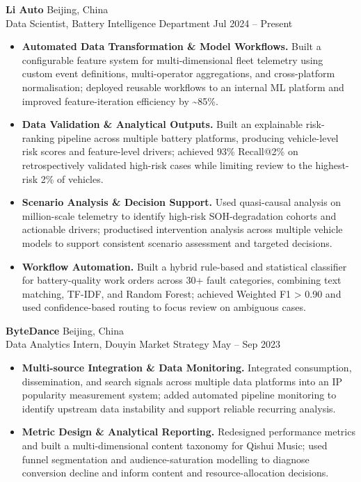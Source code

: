 \documentclass[a4paper,10pt]{article}
\begin{document}
\noindent\textbf{Li Auto} \hfill Beijing, China\\
Data Scientist, Battery Intelligence Department \hfill Jul 2024 -- Present
\begin{itemize}
    \item \textbf{Automated Data Transformation \& Model Workflows.} Built a configurable feature system for multi-dimensional fleet telemetry using custom event definitions, multi-operator aggregations, and cross-platform normalisation; deployed reusable workflows to an internal ML platform and improved feature-iteration efficiency by \textasciitilde85\%.

    \item \textbf{Data Validation \& Analytical Outputs.} Built an explainable risk-ranking pipeline across multiple battery platforms, producing vehicle-level risk scores and feature-level drivers; achieved 93\% Recall@2\% on retrospectively validated high-risk cases while limiting review to the highest-risk 2\% of vehicles.

    \item \textbf{Scenario Analysis \& Decision Support.} Used quasi-causal analysis on million-scale telemetry to identify high-risk SOH-degradation cohorts and actionable drivers; productised intervention analysis across multiple vehicle models to support consistent scenario assessment and targeted decisions.

    \item \textbf{Workflow Automation.} Built a hybrid rule-based and statistical classifier for battery-quality work orders across 30+ fault categories, combining text matching, TF-IDF, and Random Forest; achieved Weighted F1 > 0.90 and used confidence-based routing to focus review on ambiguous cases.
\end{itemize}

\vspace{2pt}
\noindent\textbf{ByteDance} \hfill Beijing, China\\
Data Analytics Intern, Douyin Market Strategy \hfill May -- Sep 2023
\begin{itemize}
    \item \textbf{Multi-source Integration \& Data Monitoring.} Integrated consumption, dissemination, and search signals across multiple data platforms into an IP popularity measurement system; added automated pipeline monitoring to identify upstream data instability and support reliable recurring analysis.

    \item \textbf{Metric Design \& Analytical Reporting.} Redesigned performance metrics and built a multi-dimensional content taxonomy for Qishui Music; used funnel segmentation and audience-saturation modelling to diagnose conversion decline and inform content and resource-allocation decisions.
\end{itemize}
\end{document}
